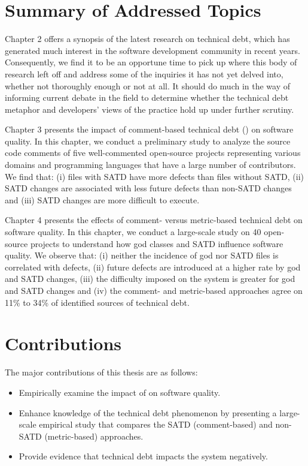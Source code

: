 
\section{Summary of Addressed Topics}


Chapter 2 offers a synopsis of the latest research on technical debt, which has generated much interest in the software development community in recent years. Consequently, we find it to be an opportune time to pick up where this body of research left off and address some of the inquiries it has not yet delved into, whether not thoroughly enough or not at all. It should do much in the way of informing current debate in the field to determine whether the technical debt metaphor and developers' views of the practice hold up under further scrutiny.

Chapter 3 presents the impact of comment-based technical debt (\SATD) on software quality. In this chapter, we conduct a preliminary study to analyze the source code comments of five well-commented open-source projects representing various domains and programming languages that have a large number of contributors. We find that: (i) files with SATD have more defects than files without SATD, (ii) SATD changes are associated with less future defects than non-SATD changes and (iii) SATD changes are more difficult to execute.

Chapter 4 presents the effects of comment- versus metric-based technical debt on software quality. In this chapter, we conduct a large-scale study on 40 open-source projects to understand how god classes and SATD influence software quality. We observe that: (i) neither the incidence of god nor SATD files is correlated with defects, (ii) future defects are introduced at a higher rate by god and SATD changes, (iii) the difficulty imposed on the system is greater for god and SATD changes and (iv) the comment- and metric-based approaches agree on 11\% to 34\% of identified sources of technical debt.

\section{Contributions}
The major contributions of this thesis are as follows:

\begin{itemize}
	\item Empirically examine the impact of \SATD on software quality.
\item Enhance knowledge of the technical debt phenomenon by presenting a large-scale empirical study that compares the SATD (comment-based) and non-SATD (metric-based) approaches.
\item Provide evidence that technical debt impacts the system negatively.
\end{itemize}

